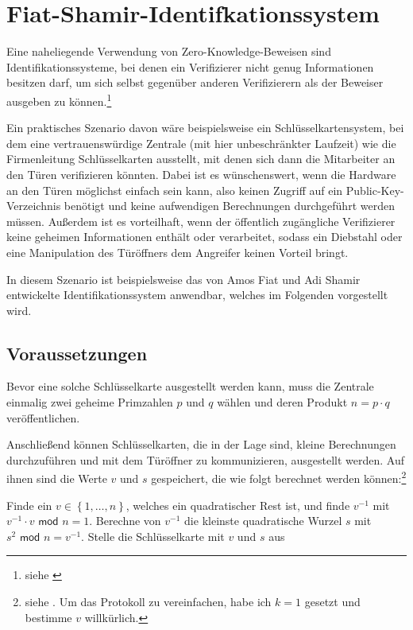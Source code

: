 \section{Fiat-Shamir-Identifkationssystem}

Eine naheliegende Verwendung von Zero-Knowledge-Beweisen sind Identifikationssysteme, bei denen ein Verifizierer nicht genug Informationen besitzen darf, um sich selbst gegenüber anderen Verifizierern als der Beweiser ausgeben zu können.\footnote{siehe \cite[Seite 1]{fiatshamir}}

Ein praktisches Szenario davon wäre beispielsweise ein Schlüsselkartensystem, bei dem eine vertrauenswürdige Zentrale (mit hier unbeschränkter Laufzeit) wie die Firmenleitung Schlüsselkarten ausstellt, mit denen sich dann die Mitarbeiter an den Türen verifizieren könnten. Dabei ist es wünschenswert, wenn die Hardware an den Türen möglichst einfach sein kann, also keinen Zugriff auf ein Public-Key-Verzeichnis benötigt und keine aufwendigen Berechnungen durchgeführt werden müssen. Außerdem ist es vorteilhaft, wenn der öffentlich zugängliche Verifizierer keine geheimen Informationen enthält oder verarbeitet, sodass ein Diebstahl oder eine Manipulation des Türöffners dem Angreifer keinen Vorteil bringt. 

In diesem Szenario ist beispielsweise das von Amos Fiat und Adi Shamir entwickelte Identifikationssystem anwendbar, welches im Folgenden vorgestellt wird.

\subsection{Voraussetzungen}

Bevor eine solche Schlüsselkarte ausgestellt werden kann, muss  die Zentrale einmalig zwei geheime Primzahlen \( p \) und \( q \) wählen und deren Produkt \( n = p \cdot q \) veröffentlichen.

Anschließend können Schlüsselkarten, die in der Lage sind, kleine Berechnungen durchzuführen und mit dem Türöffner zu kommunizieren, ausgestellt werden. Auf ihnen sind  die Werte \( v \) und \( s \) gespeichert, die wie folgt berechnet werden können:\footnote{siehe \cite{fiatshamir}. Um das Protokoll zu vereinfachen, habe ich \( k = 1 \) gesetzt und bestimme \( v \) willkürlich.}

\vspace{0.2cm}

\begin{algorithm}
\label{algorithm:issue}
Finde ein \( v \in \left\lbrace 1, \dots, n \right\rbrace \), welches ein quadratischer Rest ist, und finde \( v^{-1} \) mit \( v^{-1} \cdot v \textsf{ mod } n = 1 \). Berechne von \( v^{-1} \) die kleinste quadratische Wurzel \( s \) mit \( s^{2} \textsf{ mod } n = v^{-1} \). Stelle die Schlüsselkarte mit \( v \) und \( s \) aus
\end{algorithm}

